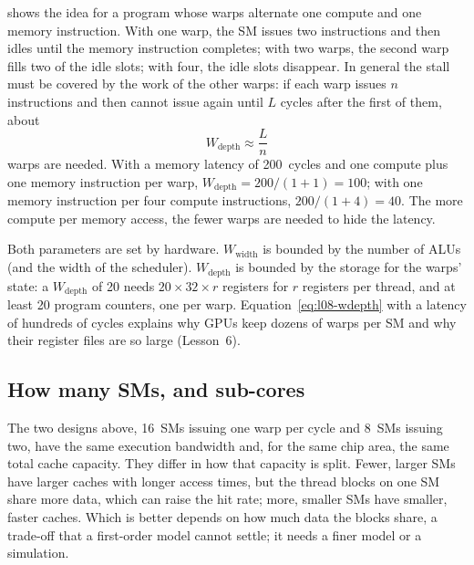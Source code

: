 \documentclass[../main.tex]{subfiles}
\begin{document}
 shows the idea for a program whose warps
alternate one compute and one memory instruction.  With one warp, the
SM issues two instructions and then idles until the memory instruction
completes; with two warps, the second warp fills two of the idle
slots; with four, the idle slots disappear.  In general the stall must
be covered by the work of the other warps: if each warp issues $n$
instructions and then cannot issue again until $L$ cycles after the
first of them, about
\begin{equation}
  W_{\text{depth}} \approx \frac{L}{n}
  \label{eq:l08-wdepth}
\end{equation}
warps are needed.  With a memory latency
of \num{200}~cycles and one compute plus one memory instruction per
warp, $W_{\text{depth}} = 200/(1+1) = 100$; with one memory instruction
per four compute instructions, $200/(1+4) = 40$.  The more compute per
memory access, the fewer warps are needed to hide the latency.

Both parameters are set by hardware.  $W_{\text{width}}$ is bounded by
the number of ALUs (and the width of the scheduler).
$W_{\text{depth}}$ is bounded by the storage for the warps' state: a
$W_{\text{depth}}$ of 20 needs $20 \times 32 \times r$ registers for $r$
registers per thread, and at least 20 program counters, one per
warp.  Equation~\eqref{eq:l08-wdepth}
with a latency of hundreds of cycles explains why GPUs keep dozens of
warps per SM and why their register files are so large (Lesson~6).

\subsection{How many SMs, and sub-cores}

The two designs above, 16~SMs issuing one warp per cycle and 8~SMs
issuing two, have the same execution bandwidth and, for the same chip
area, the same total cache capacity.  They differ in how that capacity
is split.  Fewer, larger SMs have larger caches with longer access
times, but the thread blocks on one SM share more data, which can raise
the hit rate; more, smaller SMs have smaller, faster caches.  Which is
better depends on how much data the blocks share, a trade-off that a
first-order model cannot settle; it needs a finer model or a
simulation.
\end{document}
